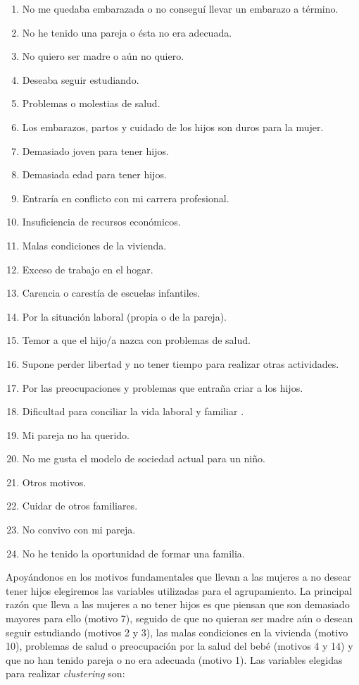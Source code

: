 \documentclass[a4paper, 20pt]{article}
\begin{document}
\begin{enumerate}
\addtocounter{enumi}{-1}
\item No me quedaba embarazada o no conseguí llevar un embarazo a término.
\item No he tenido una pareja o ésta no era adecuada.
\item No quiero ser madre o aún no quiero.
\item Deseaba seguir estudiando.
\item Problemas o molestias de salud.
\item Los embarazos, partos y cuidado de los hijos son duros para la mujer.
\item Demasiado joven para tener hijos.
\item Demasiada edad para tener hijos.
\item Entraría en conflicto con mi carrera profesional.
\item Insuficiencia de recursos económicos.
\item Malas condiciones de la vivienda.
\item Exceso de trabajo en el hogar.
\item Carencia o carestía de escuelas infantiles.
\item Por la situación laboral (propia o de la pareja).
\item Temor a que el hijo/a nazca con problemas de salud.
\item Supone perder libertad y no tener tiempo para realizar otras  actividades.
\item Por las preocupaciones y problemas que entraña criar a los hijos.
\item Dificultad para conciliar la vida laboral y familiar .
\item Mi pareja no ha querido.
\item No me gusta el modelo de sociedad actual para un niño.
\item Otros motivos.
\item Cuidar de otros familiares.
\item No convivo con mi pareja.
\item No he tenido la oportunidad de formar una familia.
\end{enumerate}

Apoyándonos en los motivos fundamentales que llevan a las mujeres a no desear tener hijos elegiremos las variables utilizadas para el agrupamiento. La principal razón que lleva a las mujeres a no tener hijos es que piensan que son demasiado mayores para ello (motivo 7), seguido de que no quieran ser madre aún o desean seguir estudiando (motivos 2 y 3), las malas condiciones en la vivienda (motivo 10), problemas de salud o preocupación por la salud del bebé (motivos 4 y 14) y que no han tenido pareja o no era adecuada (motivo 1). Las variables elegidas para realizar \textit{clustering} son:
\end{document}
